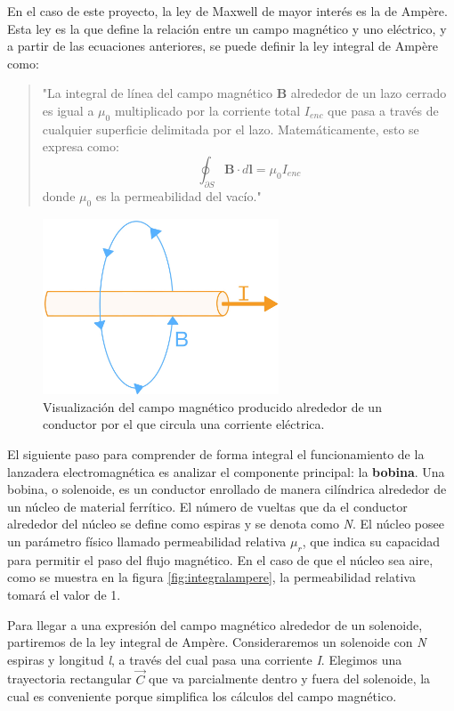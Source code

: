 En el caso de este proyecto, la ley de Maxwell de mayor interés es la de Ampère. Esta ley es la que define la relación entre un campo magnético y uno eléctrico, y a partir de las ecuaciones anteriores, se puede definir la ley integral de Ampère como:

\begin{quote}
    "La integral de línea del campo magnético \(\mathbf{B}\) alrededor de un lazo cerrado es igual a \(\mu_0\) multiplicado por la corriente total \(I_{enc}\) que pasa a través de cualquier superficie delimitada por el lazo. Matemáticamente, esto se expresa como:
    \[
    \oint_{\partial S} \mathbf{B} \cdot d\mathbf{l} = \mu_0 I_{enc}
    \]
    donde \(\mu_0\) es la permeabilidad del vacío."
\end{quote}

\begin{figure}[H]
    \centering %
    \includegraphics[width=7cm]{FigurasMemoria/amperelaw.jpg}
    \caption{Visualización del campo magnético producido alrededor de un conductor por el que circula una corriente eléctrica.}
    \label{fig:amperelaw} %
\end{figure}

El siguiente paso para comprender de forma integral el funcionamiento de la lanzadera electromagnética es analizar el componente principal: la \textbf{bobina}. Una bobina, o solenoide, es un conductor enrollado de manera cilíndrica alrededor de un núcleo de material ferrítico. El número de vueltas que da el conductor alrededor del núcleo se define como espiras y se denota como \textit{N}. El núcleo posee un parámetro físico llamado permeabilidad relativa \(\mu_r\), que indica su capacidad para permitir el paso del flujo magnético. En el caso de que el núcleo sea aire, como se muestra en la figura \ref{fig:integralampere}, la permeabilidad relativa tomará el valor de 1.

Para llegar a una expresión del campo magnético alrededor de un solenoide, partiremos de la ley integral de Ampère. Consideraremos un solenoide con \textit{N} espiras y longitud \textit{l}, a través del cual pasa una corriente \textit{I}. Elegimos una trayectoria rectangular \(\vec{C}\) que va parcialmente dentro y fuera del solenoide, la cual es conveniente porque simplifica los cálculos del campo magnético.

